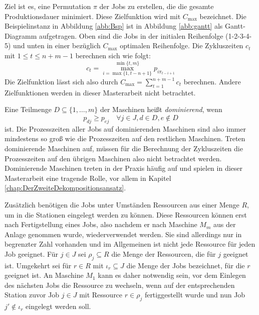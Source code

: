 \documentclass{scrreprt}
\begin{document}
Ziel ist es, eine Permutation $\pi$ der Jobs zu erstellen, die die gesamte Produktionsdauer minimiert.
Diese Zielfunktion wird mit $C_{\max}$ bezeichnet.
Die Beispielinstanz in Abbildung \ref{abb:Bsp} ist in Abbildung \ref{abb:gantt} als Gantt-Diagramm aufgetragen.
Oben sind die Jobs in der initialen Reihenfolge (1-2-3-4-5) und unten in einer bezüglich $C_{\max}$ optimalen Reihenfolge.
Die Zykluszeiten $c_t$ mit $1\leq t\leq n+m-1$ berechnen sich wie folgt:
\[ c_t = \max_{i=\max\{1,t-n+1\}}^{\min\{t,m\}} p_{i\pi_{t-i+1}} \]
Die Zielfunktion lässt sich also durch $C_{\max} = \sum_{t=1}^{n+m-1} c_t$ berechnen.
Andere Zielfunktionen werden in dieser Masterarbeit nicht betrachtet.

Eine Teilmenge $D \subseteq \{1,\ldots,m\}$ der Maschinen heißt \textit{dominierend}, wenn 
\[ p_{dj} \geq p_{ej} \quad \forall j\in J, d\in D, e\not\in D \] 
ist. 
Die Prozesszeiten aller Jobs auf dominierenden Maschinen sind also immer mindestens so groß wie die Prozesszeiten auf den restlichen Maschinen.
Treten dominierende Maschinen auf, müssen für die Berechnung der Zykluszeiten die Prozesszeiten auf den übrigen Maschinen also nicht betrachtet werden.
Dominierende Maschinen treten in der Praxis häufig auf und spielen in dieser Masterarbeit eine tragende Rolle, 
vor allem in Kapitel \ref{chap:DerZweiteDekompositionsansatz}.

Zusätzlich benötigen die Jobs unter Umständen Ressourcen aus einer Menge $R$, um in die Stationen eingelegt werden zu können. Diese Ressourcen können erst nach
Fertigstellung eines Jobs, also nachdem er nach Maschine $M_m$ aus der Anlage genommen wurde, wiederverwendet werden.
Sie sind allerdings nur in begrenzter Zahl vorhanden und im Allgemeinen ist nicht jede Ressource für jeden Job geeignet.
Für $j\in J$ sei $\rho_j\subseteq R$ die Menge der Ressourcen, die für $j$ geeignet ist.
Umgekehrt sei für $r\in R$ mit $\iota_r\subseteq J$ die Menge der Jobs bezeichnet, für die $r$ geeignet ist.
An Maschine $M_1$ kann es daher notwendig sein, vor dem Einlegen des nächsten Jobs die Ressource zu wechseln, 
wenn auf der entsprechenden Station zuvor Job $j\in J$ mit Ressource $r\in\rho_j$ fertiggestellt wurde 
und nun Job $j'\not\in\iota_r$ eingelegt werden soll.
\end{document}
